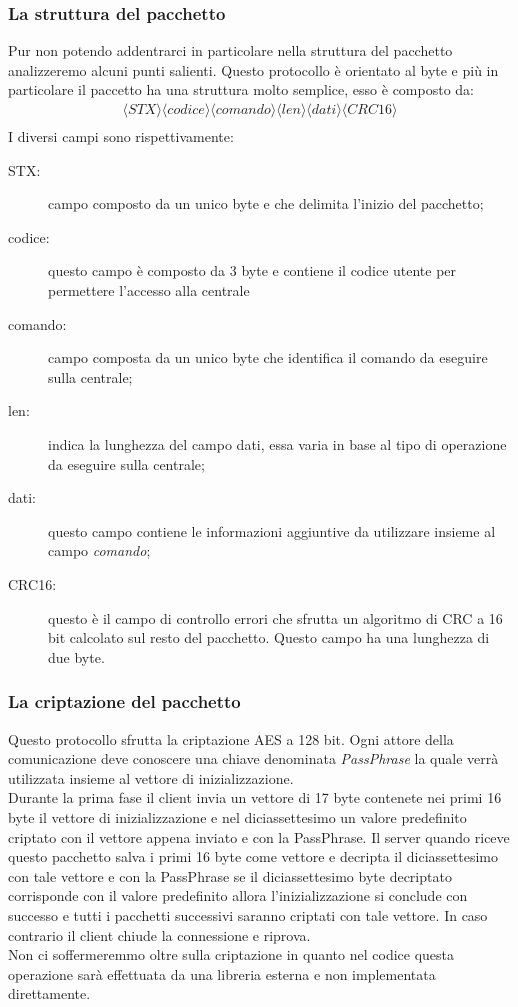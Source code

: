 \subsubsection{La struttura del pacchetto}
Pur non potendo addentrarci in particolare nella struttura del pacchetto analizzeremo alcuni punti salienti. Questo protocollo è orientato al byte e più in particolare il paccetto ha una struttura molto semplice, esso è composto da:
$$
\begin{array}{c}
\langle STX\rangle\langle codice\rangle\langle comando\rangle\langle len\rangle\langle dati\rangle\langle CRC16\rangle\\
\end{array}	 
$$
I diversi campi sono rispettivamente:
\begin{description}
	\item[STX:] campo composto da un unico byte e che delimita l'inizio del pacchetto;
	\item[codice:] questo campo è composto da 3 byte e contiene il codice utente per permettere l'accesso alla centrale
	\item[comando:] campo composta da un unico byte che identifica il comando da eseguire sulla centrale;
	\item[len:] indica la lunghezza del campo dati, essa varia in base al tipo di operazione da eseguire sulla centrale;
	\item[dati:] questo campo contiene le informazioni aggiuntive da utilizzare insieme al campo \emph{comando};
	\item[CRC16:] questo è il campo di controllo errori che sfrutta un algoritmo di CRC a 16 bit calcolato sul resto del pacchetto. Questo campo ha una lunghezza di due byte.
\end{description}
\subsubsection{La criptazione del pacchetto}
Questo protocollo sfrutta la criptazione AES a 128 bit. Ogni attore della comunicazione deve conoscere una chiave denominata \emph{PassPhrase} la quale verrà utilizzata insieme al vettore di inizializzazione.\\
Durante la prima fase il client invia un vettore di 17 byte contenete nei primi 16 byte il vettore di inizializzazione e nel diciassettesimo un valore predefinito criptato con il vettore appena inviato e con la PassPhrase. Il server quando riceve questo pacchetto salva i primi 16 byte come vettore e decripta il diciassettesimo con tale vettore e con la PassPhrase se il diciassettesimo byte decriptato corrisponde con il valore predefinito allora l'inizializzazione si conclude con successo e tutti i pacchetti successivi saranno criptati con tale vettore. In caso contrario il client chiude la connessione e riprova.\\
Non ci soffermeremmo oltre sulla criptazione in quanto nel codice questa operazione sarà effettuata da una libreria esterna e non implementata direttamente.
